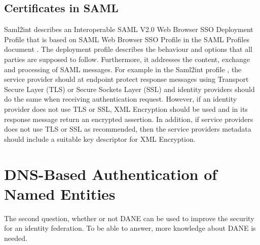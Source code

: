\subsection{Certificates in SAML}

Saml2int \cite{website:saml2int} describes an Interoperable SAML V2.0 Web Browser SSO Deployment Profile that is based on 
SAML Web Browser SSO Profile in the SAML Profiles document \cite{pdf:oasis-open-profiles}. 
The deployment profile describes the behaviour and options that all parties are supposed to follow. 
Furthermore, it addresses the content, exchange and processing of SAML messages.
For example in the Saml2int profile \cite{website:saml2int}, the service provider should at endpoint protect response 
messages using Transport Secure Layer (TLS) or Secure Sockets Layer (SSL)  and identity providers should do the same when receiving 
authentication request. 
However, if an identity provider does not use TLS or SSL, XML Encryption should be used and in its response message return an encrypted assertion. 
In addition, if service providers does not use TLS or SSL as recommended, then the service providers metadata should include a suitable key descriptor for XML Encryption.


\section{DNS-Based Authentication of Named Entities} 
The second question, whether or not DANE can be used to improve the security for an identity federation. To be able to answer, more knowledge about DANE is needed.

